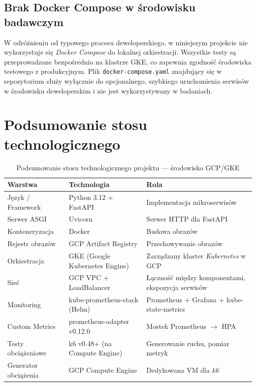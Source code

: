 \subsection{Brak Docker Compose w środowisku badawczym}

W odróżnieniu od typowego procesu deweloperskiego, w niniejszym projekcie nie wykorzystuje się \textit{Docker Compose} do lokalnej orkiestracji. Wszystkie testy są przeprowadzane bezpośrednio na klastrze GKE, co zapewnia zgodność środowiska testowego z produkcyjnym. Plik \texttt{docker-compose.yaml} znajdujący się w repozytorium służy wyłącznie do opcjonalnego, szybkiego uruchomienia serwisów w środowisku deweloperskim i nie jest wykorzystywany w badaniach.

\section{Podsumowanie stosu technologicznego}

\begin{table}[H]
  \centering
  \begin{tabularx}{\textwidth}{|l|X|l|}
    \hline
    \textbf{Warstwa} & \textbf{Technologia} & \textbf{Rola} \\
    \hline
    Język / Framework & Python 3.12 + FastAPI & Implementacja mikroserwisów \\
    Serwer ASGI & Uvicorn & Serwer HTTP dla FastAPI \\
    Konteneryzacja & Docker & Budowa obrazów \\
    Rejestr obrazów & GCP Artifact Registry & Przechowywanie obrazów \\
    Orkiestracja & GKE (Google Kubernetes Engine) & Zarządzany klaster \textit{Kubernetes} w GCP \\
    Sieć & GCP VPC + LoadBalancer & Łączność między komponentami, ekspozycja serwisów \\
    Monitoring & kube-prometheus-stack (Helm) & Prometheus + Grafana + kube-state-metrics \\
    Custom Metrics & prometheus-adapter v0.12.0 & Mostek Prometheus $\rightarrow$ HPA \\
    Testy obciążeniowe & k6 v0.48+ (na Compute Engine) & Generowanie ruchu, pomiar metryk \\
    Generator obciążenia & GCP Compute Engine & Dedykowana VM dla \textit{k6} \\
    \hline
  \end{tabularx}
  \caption{Podsumowanie stosu technologicznego projektu — środowisko GCP/GKE}
  \label{tab:tech-stack}
\end{table}
